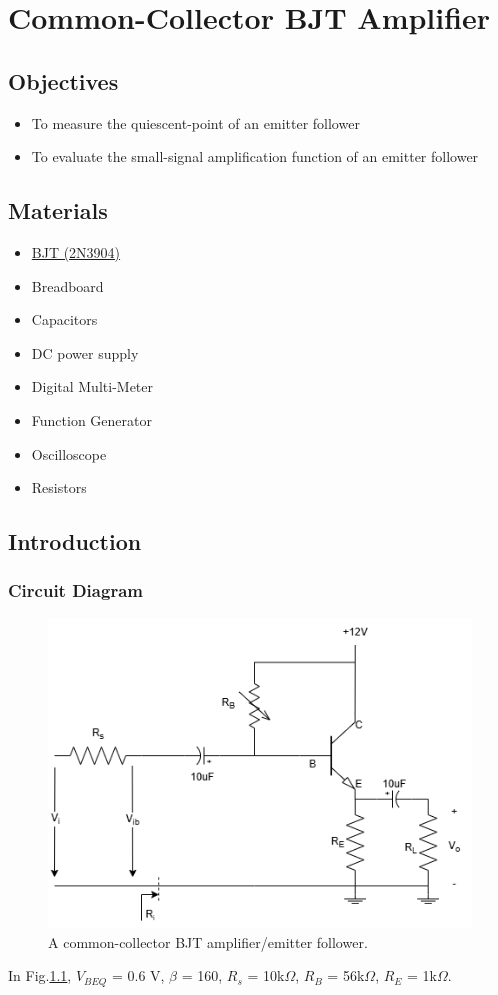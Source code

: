 \chapter{Common-Collector BJT Amplifier}


\section{Objectives}
\begin{itemize}
    \item To measure the quiescent-point of an emitter follower
    \item To evaluate the small-signal amplification function of an emitter follower
\end{itemize}

\section{Materials}
\begin{itemize}
    \item \hyperref[2N3904_1]{BJT (2N3904)}
    \item Breadboard
    \item Capacitors
    \item DC power supply
    \item Digital Multi-Meter
    \item Function Generator
    \item Oscilloscope
    \item Resistors
\end{itemize}

\section{Introduction}
    \subsection{Circuit Diagram}
    \begin{figure}[h]
        \centering
        \includegraphics[width=0.7\linewidth]{Lab07/Lab7.drawio.png}
        \caption{A common-collector BJT amplifier/emitter follower.}
        \label{l7f}
    \end{figure}
    \FloatBarrier
In Fig.\ref{l7f}, $V_{BEQ}$ = 0.6 V, $\beta$ = 160, $R_s$ = 10k$\Omega$, $R_B$ = 56k$\Omega$, $R_E$ = 1k$\Omega$.

